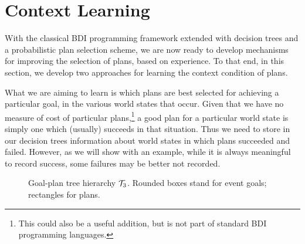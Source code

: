 \section{Context Learning}\label{sec:context_learning}


With the classical BDI programming framework extended with decision
trees and a probabilistic plan selection scheme, we are now ready to
develop mechanisms for improving the selection of plans, based on
experience.
%
To that end, in this section, we develop two approaches for learning
the context condition of plans.

What we are aiming to learn is which plans are best selected for
achieving a particular goal, in the various world states that
occur. Given that we have no measure of cost of particular
plans,\footnote{This could also be a useful addition, but is not part
  of standard BDI programming languages.} a good plan for a
particular world state is simply one which (usually) succeeds in that
situation. Thus we need to store in our decision trees information
about world states in which plans succeeded and failed.  However, as
we will show with an example, while it is always meaningful to record
success, some failures may be better not recorded.

\begin{figure}[t]
\begin{center}

\end{center}
\caption{Goal-plan tree hierarchy ${\mathcal{T}}_3$. Rounded boxes stand for event goals; rectangles for
plans.}
%
\label{fig:tree03}
\end{figure}

